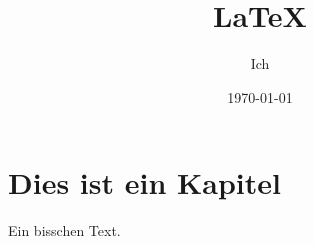 \documentclass[a4paper, 12pt]{article}
\title{LaTeX}
\author{Ich}
\date{\today}
\begin{document}
\maketitle
\tableofcontents %

\section{Dies ist ein Kapitel} %

Ein bisschen Text.

\end{document}
